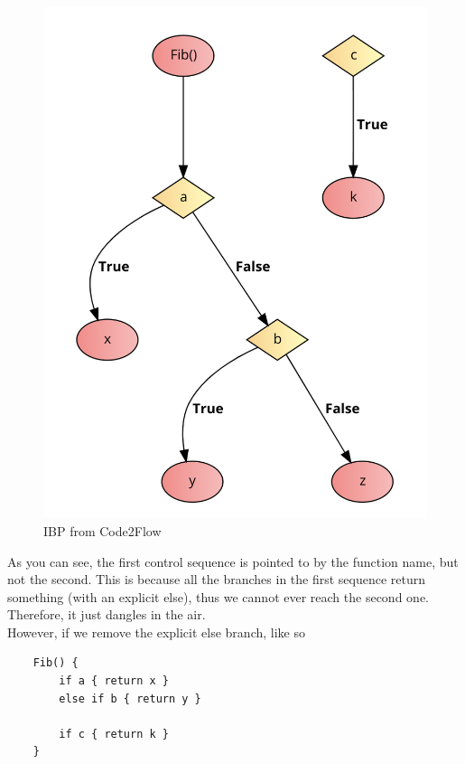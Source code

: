 \begin{figure}[ht]
    \centering
    \includegraphics[scale=0.4]{assets/weirdFlowchartC2F.png}
    \caption{IBP from Code2Flow}
    \label{fig:c2f_weird}
\end{figure}

As you can see, the first control sequence is pointed to by the function name, but not the second. This is because all the branches in the first sequence return something (with an explicit else), thus we cannot ever reach the second one. Therefore, it just dangles in the air. \\

However, if we remove the explicit else branch, like so

\begin{lstlisting}
    Fib() {
        if a { return x }
        else if b { return y }

        if c { return k }
    }
\end{lstlisting}

